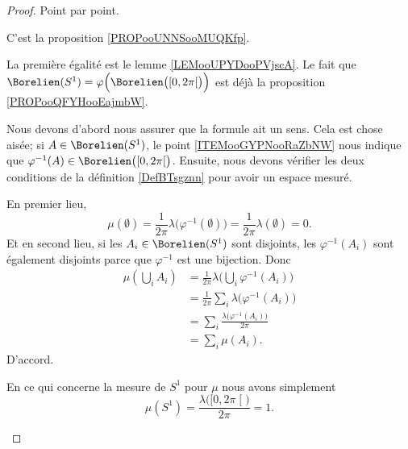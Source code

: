 \begin{proof}
	Point par point.
	\begin{subproof}
		\item[Pour \ref{ITEMooSUNEooRhAdep}]
		C'est la proposition \ref{PROPooUNNSooMUQKfp}.

		\item[Pour \ref{ITEMooGYPNooRaZbNW}]
		La première égalité est le lemme \ref{LEMooUPYDooPVjscA}. Le fait que \( \Borelien(S^1)=\varphi\Big( \Borelien\big( \mathopen[ 0 , 2\pi \mathclose[ \big) \Big)\) est déjà la proposition \ref{PROPooQFYHooEajmbW}.

		\item[Pour \ref{ITEMooFUXKooFQdoaw}]
		Nous devons d'abord nous assurer que la formule ait un sens. Cela est chose aisée; si \( A\in \Borelien(S^1)\), le point \ref{ITEMooGYPNooRaZbNW} nous indique que \( \varphi^{-1}(A)\in \Borelien\big( \mathopen[ 0 , 2\pi \mathclose[ \big)\). Ensuite, nous devons vérifier les deux conditions de la définition \ref{DefBTsgznn} pour avoir un espace mesuré.

		En premier lieu,
		\begin{equation}
			\mu(\emptyset)=\frac{1}{ 2\pi }\lambda\big( \varphi^{-1}(\emptyset) \big)=\frac{1}{ 2\pi }\lambda(\emptyset)=0.
		\end{equation}
		Et en second lieu, si les \( A_i\in \Borelien(S^1)\) sont disjoints, les \( \varphi^{-1}(A_i)\) sont également disjoints parce que \( \varphi^{-1}\) est une bijection. Donc
		\begin{subequations}
			\begin{align}
				\mu(\bigcup_iA_i) & =\frac{1}{ 2\pi }\lambda\big( \bigcup_i\varphi^{-1}(A_i) \big) \\
				                  & =\frac{1}{ 2\pi }\sum_i\lambda\big( \varphi^{-1}(A_i) \big)    \\
				                  & =\sum_i\frac{ \lambda\big( \varphi^{-1}(A_i) \big) }{ 2\pi }   \\
				                  & =\sum_i\mu(A_i).
			\end{align}
		\end{subequations}
		D'accord.

		\item[Pour \ref{ITEMooBQLRooOsqesg}]
		En ce qui concerne la mesure de \( S^1\) pour \(\mu\) nous avons simplement
		\begin{equation}
			\mu(S^1)=\frac{ \lambda\big( \mathopen[ 0 , 2\pi \mathclose[ \big) }{ 2\pi }=1.
		\end{equation}
	\end{subproof}
\end{proof}

